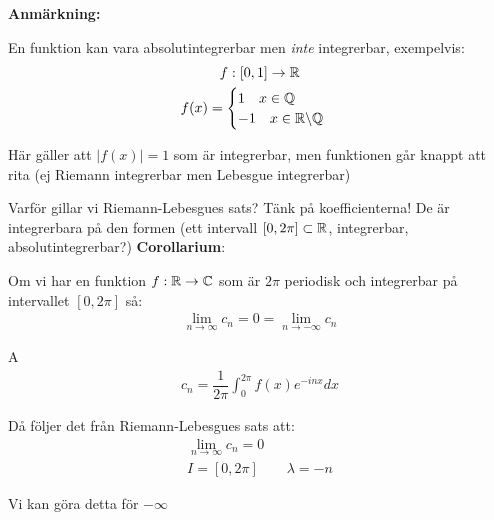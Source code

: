 \par\bigskip
\noindent\textbf{Anmärkning:}\par
\noindent En funktion kan vara absolutintegrerbar men \textit{inte} integrerbar, exempelvis:
\begin{equation*}
  \begin{gathered}
    f:[0,1]\to\mathbb{R}\\
    f(x) = \begin{cases}1\quad x\in\mathbb{Q}\\-1\quad x\in\mathbb{R}\backslash\mathbb{Q}\end{cases}
  \end{gathered}
\end{equation*}
\par\bigskip
\noindent Här gäller att $\left|f(x)\right| = 1$ som är integrerbar, men funktionen går knappt att rita (ej Riemann integrerbar men Lebesgue integrerbar)
\par\bigskip
\noindent Varför gillar vi Riemann-Lebesgues sats? Tänk på koefficienterna! De är integrerbara på den formen (ett intervall $[0,2\pi]\subset \mathbb{R}$, integrerbar, absolutintegrerbar?)
\newpage
\noindent\textbf{Corollarium}:\par
\noindent Om vi har en funktion $f:\mathbb{R}\to\mathbb{C}$ som är $2\pi$ periodisk och integrerbar på intervallet $[0,2\pi]$ så:
\begin{equation*}
  \begin{gathered}
    \lim_{n\to\infty}c_n = 0 = \lim_{n\to-\infty}c_n
  \end{gathered}
\end{equation*}
\par\bigskip
\begin{prf}
  A
  \begin{equation*}
    \begin{gathered}
      c_n = \dfrac{1}{2\pi}\int_{0}^{2\pi}f(x)e^{-inx}dx
    \end{gathered}
  \end{equation*}
  \par\bigskip
  \noindent Då följer det från Riemann-Lebesgues sats att:
  \begin{equation*}
    \begin{gathered}
      \lim_{n\to\infty}c_n = 0\\
      I = [0,2\pi]\qquad\lambda = -n
    \end{gathered}
  \end{equation*}
  \par\bigskip
  \noindent Vi kan göra detta för $-\infty$
\end{prf}

